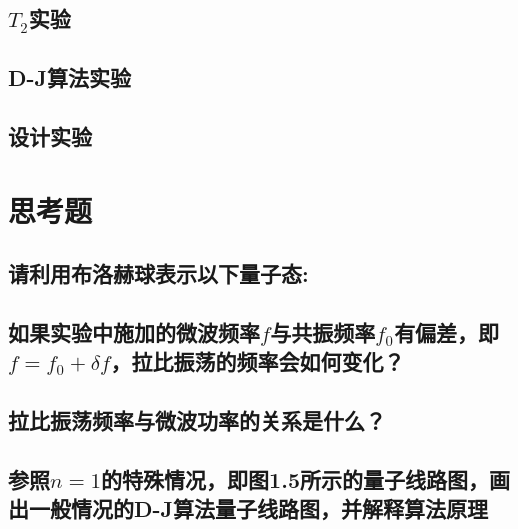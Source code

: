 \documentclass[a4paper]{article}
\begin{document}
\subsection{$ T_2 $实验}
\subsection{D-J算法实验}
\subsection{设计实验}






\section{思考题}
\subsection*{请利用布洛赫球表示以下量子态:}

\subsection*{如果实验中施加的微波频率$ f $与共振频率$ f_0 $有偏差，即$ f = f_0 + \delta f $，拉比振荡的频率会如何变化？}

\subsection*{拉比振荡频率与微波功率的关系是什么？}

\subsection*{参照$ n=1 $的特殊情况，即图1.5所示的量子线路图，画出一般情况的D-J算法量子线路图，并解释算法原理}



\end{document}
